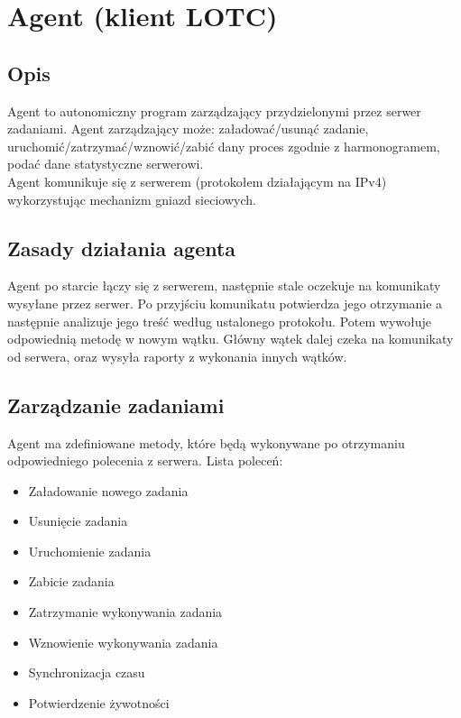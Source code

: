 \documentclass[10pt,a4paper]{article}
\begin{document}
    \section{Agent (klient LOTC)}
		\subsection{Opis}
			Agent to autonomiczny program zarządzający przydzielonymi przez serwer zadaniami. Agent zarządzający może: załadować/usunąć zadanie, uruchomić/zatrzymać/wznowić/zabić dany proces zgodnie z harmonogramem, podać dane statystyczne serwerowi. \\
			Agent komunikuje się z serwerem (protokołem działającym na IPv4) wykorzystując mechanizm gniazd sieciowych. \\
		
		\subsection{Zasady działania agenta}
			Agent po starcie łączy się z serwerem, następnie stale oczekuje na komunikaty wysyłane przez serwer. Po przyjściu komunikatu potwierdza jego otrzymanie a następnie analizuje jego treść według ustalonego protokołu. Potem wywołuje odpowiednią metodę w nowym wątku. Główny wątek dalej czeka na komunikaty od serwera, oraz wysyła raporty z wykonania innych wątków. \\
		
		\subsection{Zarządzanie zadaniami}
			Agent ma zdefiniowane metody, które będą wykonywane po otrzymaniu odpowiedniego polecenia z serwera. Lista poleceń: \\
			
			\begin{itemize}
				\item Załadowanie nowego zadania
				\item Usunięcie zadania
				\item Uruchomienie zadania
				\item Zabicie zadania
				\item Zatrzymanie wykonywania zadania
				\item Wznowienie wykonywania zadania
				\item Synchronizacja czasu
				\item Potwierdzenie żywotności 
			\end{itemize}
\end{document}
